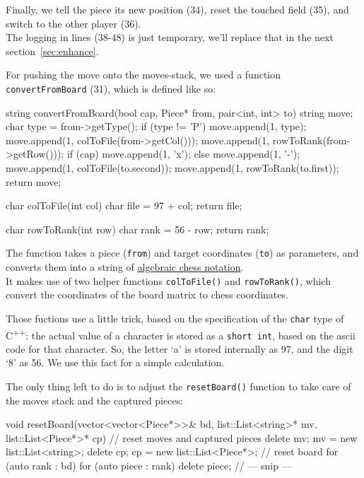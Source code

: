 Finally, we tell the piece its new position (34), reset the touched field (35), and switch to the other
player (36).\\
The logging in lines (38-48) is just temporary, we'll replace that in the next section~\ref{sec:enhance}.

For pushing the move onto the moves-stack, we used a function \texttt{convertFromBoard} (31),
which is defined like so:

\begin{cpp}
string convertFromBoard(bool cap, Piece* from, pair<int, int> to) {
  string move;
  char type = from->getType();
  if (type != 'P') {
    move.append(1, type);
  }
  move.append(1, colToFile(from->getCol()));
  move.append(1, rowToRank(from->getRow()));
  if (cap) {
    move.append(1, 'x');
  } else {
    move.append(1, '-');
  }
  move.append(1, colToFile(to.second));
  move.append(1, rowToRank(to.first));
  return move;
}

char colToFile(int col) {
  char file = 97 + col;
  return file;
}

char rowToRank(int row) {
  char rank = 56 - row;
  return rank;
}
\end{cpp}

The function takes a piece (\texttt{from}) and target coordinates (\texttt{to}) as parameters,
and converts them into a string of
\href{https://en.wikipedia.org/wiki/Algebraic_notation_(chess)}{algebraic chess notation}.\\
It makes use of two helper functions \texttt{colToFile()} and \texttt{rowToRank()},
which convert the coordinates of the board matrix to chess coordinates.

Those fuctions use a little trick, based on the specification of the \texttt{char} type of
C\textsuperscript{++}: the actual value of a character is stored as a \texttt{short int},
based on the ascii code for that character.
So, the letter `a' is stored internally as 97, and the digit `8' as 56. We use this fact for a
simple calculation.

The only thing left to do is to adjust the \texttt{resetBoard()} function to take care of
the moves stack and the captured pieces:

\begin{cpp}
void resetBoard(vector<vector<Piece*>>& bd,
                 list::List<string>* mv,
                 list::List<Piece*>* cp)
{
  // reset moves and captured pieces
  delete mv;
  mv = new list::List<string>;
  delete cp;
  cp = new list::List<Piece*>;
  // reset board
  for (auto rank : bd) {
    for (auto piece : rank) {
      delete piece;
    }
  }
  // --- snip ---
}
\end{cpp}

